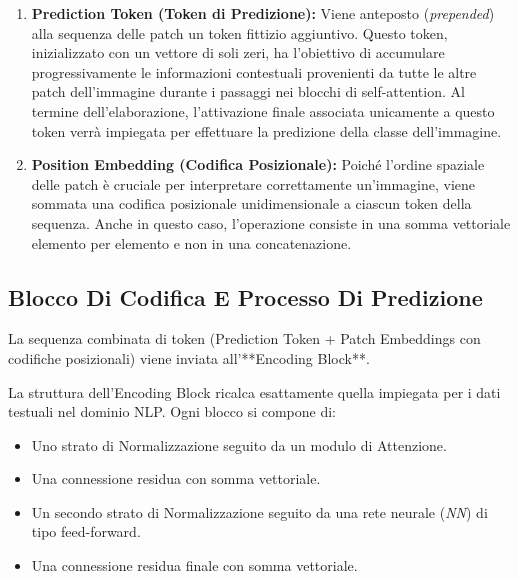 ﻿\documentclass[11pt, a4paper]{article}
\begin{document}

\begin{enumerate}
    \item \textbf{Prediction Token (Token di Predizione):} Viene anteposto (\emph{prepended}) alla sequenza delle patch un token fittizio aggiuntivo. Questo token, inizializzato con un vettore di soli zeri, ha l'obiettivo di accumulare progressivamente le informazioni contestuali provenienti da tutte le altre patch dell'immagine durante i passaggi nei blocchi di self-attention. Al termine dell'elaborazione, l'attivazione finale associata unicamente a questo token verrà impiegata per effettuare la predizione della classe dell'immagine.
    \item \textbf{Position Embedding (Codifica Posizionale):} Poiché l'ordine spaziale delle patch è cruciale per interpretare correttamente un'immagine, viene sommata una codifica posizionale unidimensionale a ciascun token della sequenza. Anche in questo caso, l'operazione consiste in una somma vettoriale elemento per elemento e non in una concatenazione.
\end{enumerate}

\subsection{Blocco Di Codifica E Processo Di Predizione}

La sequenza combinata di token (Prediction Token + Patch Embeddings con codifiche posizionali) viene inviata all'**Encoding Block**.


La struttura dell'Encoding Block ricalca esattamente quella impiegata per i dati testuali nel dominio NLP. Ogni blocco si compone di:
\begin{itemize}
    \item Uno strato di Normalizzazione seguito da un modulo di Attenzione.
    \item Una connessione residua con somma vettoriale.
    \item Un secondo strato di Normalizzazione seguito da una rete neurale (\emph{NN}) di tipo feed-forward.
    \item Una connessione residua finale con somma vettoriale.
\end{itemize}
\end{document}
